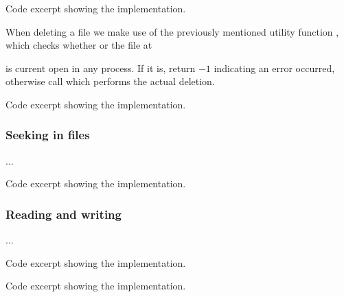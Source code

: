 {Code excerpt showing the  implementation.}

When deleting a file we make use of the previously mentioned utility function
, which checks whether or the file at

 is current open in any process. If it is, return $-1$
indicating an error occurred, otherwise call  which performs
the actual deletion.

{Code excerpt showing the  implementation.}

\subsubsection{Seeking in files}
...

{Code excerpt showing the  implementation.}

\subsubsection{Reading and writing}
...

{Code excerpt showing the  implementation.}

{Code excerpt showing the  implementation.}

